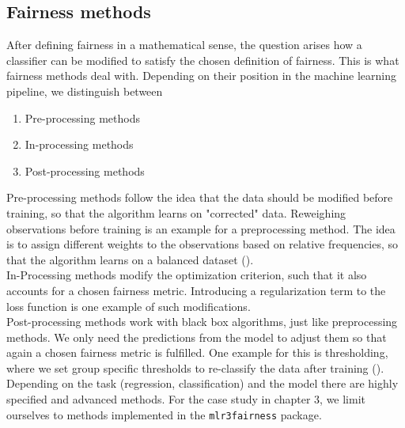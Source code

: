 \subsection{Fairness methods}
After defining fairness in a mathematical sense, the question arises how a classifier can be modified to satisfy the chosen definition of fairness. This is what fairness methods deal with.
Depending on their position in the machine learning pipeline, we distinguish between
\begin{enumerate}
    \item Pre-processing methods
    \item In-processing methods
    \item Post-processing methods
\end{enumerate}
Pre-processing methods follow the idea that the data should be modified before training, so that the algorithm learns on "corrected" data. Reweighing observations before training is an example for a preprocessing method. The idea is to assign different weights to the observations based on relative frequencies, so that the algorithm learns on a balanced dataset (\cite{caton2024}).\\
In-Processing methods modify the optimization criterion, such that it also accounts for a chosen fairness metric. Introducing a regularization term to the loss function is one example of such modifications.\\
Post-processing methods work with black box algorithms, just like preprocessing methods. We only need the predictions from the model to adjust them so that again a chosen fairness metric is fulfilled. One example for this is thresholding, where we set group specific thresholds to re-classify the data after training (\cite{hardt2016}).
Depending on the task (regression, classification) and the model there are highly specified and advanced methods. For the case study in chapter 3, we limit ourselves to methods implemented in the \texttt{mlr3fairness} package.

